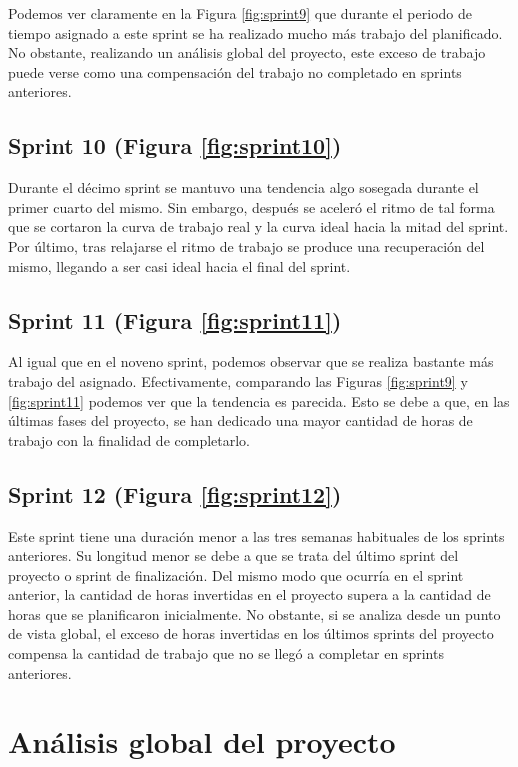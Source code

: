Podemos ver claramente en la Figura \ref{fig:sprint9} que durante el periodo de tiempo asignado a este sprint se ha realizado mucho más trabajo del planificado. No obstante, realizando un análisis global del proyecto, este exceso de trabajo puede verse como una compensación del trabajo no completado en sprints anteriores.

\subsection{Sprint 10 (Figura \ref{fig:sprint10})}

Durante el décimo sprint se mantuvo una tendencia algo sosegada durante el primer cuarto del mismo. Sin embargo, después se aceleró el ritmo de tal forma que se cortaron la curva de trabajo real y la curva ideal hacia la mitad del sprint. Por último, tras relajarse el ritmo de trabajo se produce una recuperación del mismo, llegando a ser casi ideal hacia el final del sprint.

\subsection{Sprint 11 (Figura \ref{fig:sprint11})}

Al igual que en el noveno sprint, podemos observar que se realiza bastante más trabajo del asignado. Efectivamente, comparando las Figuras \ref{fig:sprint9} y \ref{fig:sprint11} podemos ver que la tendencia es parecida. Esto se debe a que, en las últimas fases del proyecto, se han dedicado una mayor cantidad de horas de trabajo con la finalidad de completarlo.

\subsection{Sprint 12 (Figura \ref{fig:sprint12})}

Este sprint tiene una duración menor a las tres semanas habituales de los sprints anteriores. Su longitud menor se debe a que se trata del último sprint del proyecto o sprint de finalización. Del mismo modo que ocurría en el sprint anterior, la cantidad de horas invertidas en el proyecto supera a la cantidad de horas que se planificaron inicialmente. No obstante, si se analiza desde un punto de vista global, el exceso de horas invertidas en los últimos sprints del proyecto compensa la cantidad de trabajo que no se llegó a completar en sprints anteriores.

\section{Análisis global del proyecto}

